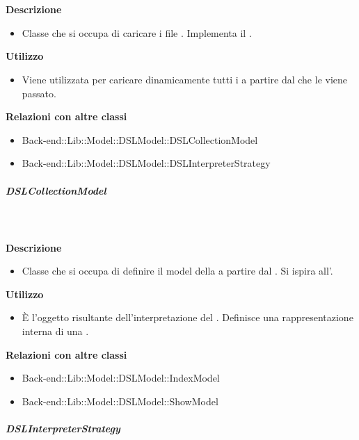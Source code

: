 				\textbf{\\ \\ Descrizione} 
					\begin{itemize}
						\item[] Classe che si occupa di caricare i file . Implementa il  .
					\end{itemize}      
				\textbf{Utilizzo}  
					\begin{itemize}
						\item[] Viene utilizzata per caricare dinamicamente tutti i  a partire dal  che le viene passato.
					\end{itemize}
					\textbf{Relazioni con altre classi}
					\begin{itemize}
							\item{Back-end::Lib::Model::DSLModel::DSLCollectionModel}
							\item{Back-end::Lib::Model::DSLModel::DSLInterpreterStrategy}
					\end{itemize}
			\subparagraph{DSLCollectionModel}
				
				\textbf{\\ \\ Descrizione} 
					\begin{itemize}
						\item[] Classe che si occupa di definire il model della  a partire dal . Si ispira all'.
					\end{itemize}      
				\textbf{Utilizzo}  
					\begin{itemize}
						\item[] È l'oggetto risultante dell'interpretazione del . Definisce una rappresentazione interna di una .
					\end{itemize}
					\textbf{Relazioni con altre classi}
					\begin{itemize}
							\item{Back-end::Lib::Model::DSLModel::IndexModel}
							\item{Back-end::Lib::Model::DSLModel::ShowModel}
					\end{itemize}
			\subparagraph{DSLInterpreterStrategy}
				

